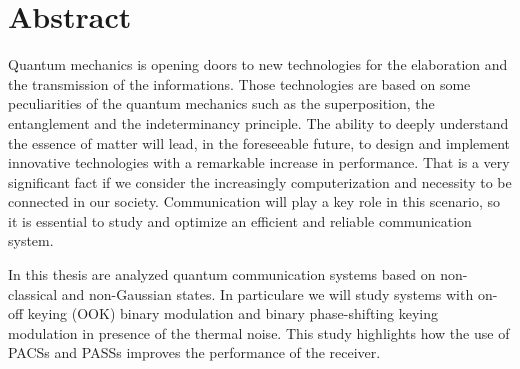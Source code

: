 
\chapter*{Abstract}
    Quantum mechanics is opening doors to new technologies for the elaboration and the transmission
    of the informations.
    Those technologies are based on some peculiarities of the quantum mechanics such as the superposition,
    the entanglement and the indeterminancy principle.
    The ability to deeply understand the essence of matter will lead, in the foreseeable future, to design
    and implement innovative technologies with a remarkable increase in performance.
    That is a very significant fact if we consider the increasingly computerization and necessity to be
    connected in our society.
    Communication will play a key role in this scenario, so it is essential to study and optimize an
    efficient and reliable communication system.

    In this thesis are analyzed quantum communication systems based on non-classical and non-Gaussian
    states. In particulare we will study systems with on-off keying (OOK) binary modulation and binary
    phase-shifting keying modulation in presence of the thermal noise. This study highlights how the use 
    of PACSs and PASSs improves the performance of the receiver.